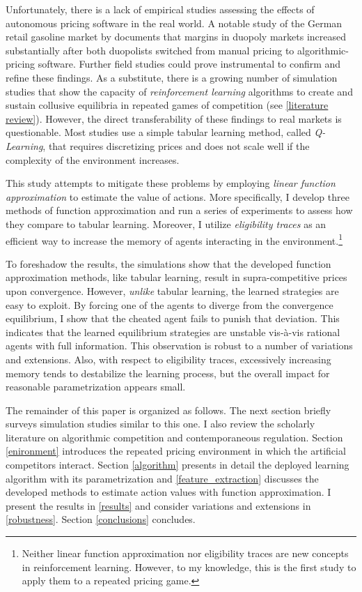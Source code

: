Unfortunately, there is a lack of empirical studies assessing the effects of autonomous pricing software in the real world. A notable study of the German retail gasoline market by \textcite{assad_algorithmic_2020} documents that margins in duopoly markets increased substantially after both duopolists switched from manual pricing to algorithmic-pricing software. Further field studies could prove instrumental to confirm and refine these findings. As a substitute, there is a growing number of simulation studies that show the capacity of \emph{reinforcement learning} algorithms to create and sustain collusive equilibria in repeated games of competition (see \autoref{literature review}). However, the direct transferability of these findings to real markets is questionable. Most studies use a simple tabular learning method, called \emph{Q-Learning}, that requires discretizing prices and does not scale well if the complexity of the environment increases.

This study attempts to mitigate these problems by employing \emph{linear function approximation} to estimate the value of actions. More specifically, I develop three methods of function approximation and run a series of experiments to assess how they compare to tabular learning. Moreover, I utilize \emph{eligibility traces} as an efficient way to increase the memory of agents interacting in the environment.\footnote{Neither linear function approximation nor eligibility traces are new concepts in reinforcement learning. However, to my knowledge, this is the first study to apply them to a repeated pricing game.}

To foreshadow the results, the simulations show that the developed function approximation methods, like tabular learning, result in supra-competitive prices upon convergence. However, \emph{unlike} tabular learning, the learned strategies are easy to exploit. By forcing one of the agents to diverge from the convergence equilibrium, I show that the cheated agent fails to punish that deviation. This indicates that the learned equilibrium strategies are unstable vis-à-vis rational agents with full information. This observation is robust to a number of variations and extensions. Also, with respect to eligibility traces, excessively increasing memory tends to destabilize the learning process, but the overall impact for reasonable parametrization appears small.

The remainder of this paper is organized as follows. The next section briefly surveys simulation studies similar to this one. I also review the scholarly literature on algorithmic competition and contemporaneous regulation. Section \ref{enironment} introduces the repeated pricing environment in which the artificial competitors interact. Section \ref{algorithm} presents in detail the deployed learning algorithm with its parametrization and \autoref{feature_extraction} discusses the developed methods to estimate action values with function approximation. I present the results in \autoref{results} and consider variations and extensions in \autoref{robustness}. Section \ref{conclusions} concludes.